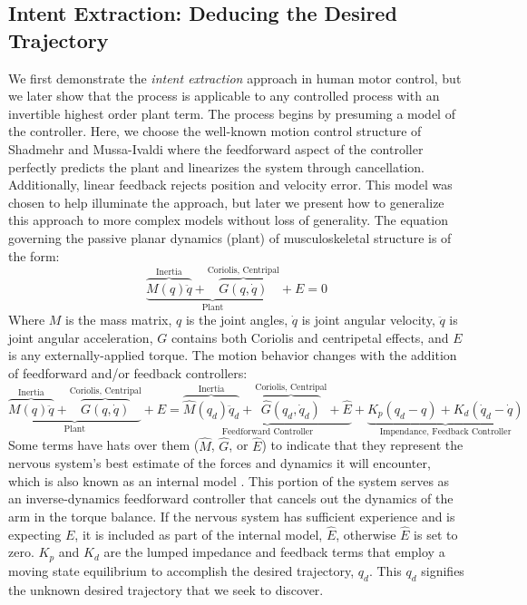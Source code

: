 \subsection*{Intent Extraction: Deducing the Desired Trajectory}
We first demonstrate the \textit{intent extraction} approach in human motor control, but we later show that the process is applicable to any controlled process with an invertible highest order plant term. The process begins by presuming a model of the controller. Here, we choose the well-known motion control structure of Shadmehr and Mussa-Ivaldi\cite{shadmehr1994adaptive} where the feedforward aspect of the controller perfectly predicts the plant and linearizes the system through cancellation. Additionally, linear feedback rejects position and velocity error. This model was chosen to help illuminate the approach, but later we present how to generalize this approach to more complex models without loss of generality. The equation governing the passive planar dynamics (plant) of musculoskeletal structure is of the form:
\begin{equation}
\underbrace{\overbrace{M(q)\ddot{q}}^{\text{Inertia}}+\overbrace{G(q,\dot{q})}^{\text{Coriolis, Centripal}}}_{\text{Plant}}+E=0
\end{equation}
Where $M$ is the mass matrix, $q$ is the joint angles, $\dot{q}$ is joint angular velocity, $\ddot{q}$ is joint angular acceleration, $G$ contains both Coriolis and centripetal effects, and $E$ is any externally-applied torque. The motion behavior changes with the addition of feedforward and/or feedback controllers:
\begin{equation}
\underbrace{\overbrace{M(q)\ddot{q}}^{\text{Inertia}}+\overbrace{G(q,\dot{q})}^{\text{Coriolis, Centripal}}}_{\text{Plant}}+E=\underbrace{\overbrace{\hat{M}(q_d)\ddot{q}_d}^{\text{Inertia}}+\overbrace{\hat{G}(q_d,\dot{q}_d)}^{\text{Coriolis, Centripal}}+\hat{E}}_{\text{Feedforward Controller}}+\underbrace{K_p(q_d-q)+K_d(\dot{q}_d-\dot{q})}_{\text{Impendance, Feedback Controller}}
\end{equation}
Some terms have hats over them ($\hat{M}$, $\hat{G}$, or $\hat{E}$) to indicate that they represent the nervous system's best estimate of the forces and dynamics it will encounter, which is also known as an internal model \cite{shadmehr1994adaptive}. This portion of the system serves as an inverse-dynamics feedforward controller that cancels out the dynamics of the arm in the torque balance. If the nervous system has sufficient experience and is expecting $E$, it is included as part of the internal model, $\hat{E}$, otherwise $\hat{E}$ is set to zero. $K_p$ and $K_d$ are the lumped impedance and feedback terms that employ a moving state equilibrium to accomplish the desired trajectory, $q_d$. This $q_d$ signifies the unknown desired trajectory that we seek to discover.

